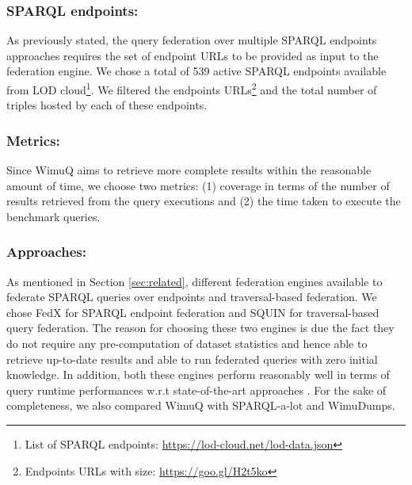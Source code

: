 \subsubsection{SPARQL endpoints:} As previously stated, the query federation over multiple SPARQL endpoints approaches requires the set of endpoint URLs to be provided as input to the federation engine. We chose a total of 539 active SPARQL endpoints available from LOD cloud\footnote{List of SPARQL endpoints: \url{https://lod-cloud.net/lod-data.json}}. We filtered the endpoints URLs\footnote{\label{endpoints}Endpoints URLs with size: \url{https://goo.gl/H2t5ko}} and the total number of triples hosted by each of these endpoints. 

\subsubsection{Metrics:} Since WimuQ aims to retrieve more complete results within the reasonable amount of time, we choose two metrics: (1) coverage in terms of the number of results retrieved from the query executions and (2) the time taken to execute the benchmark queries. 

\subsubsection{Approaches:} As mentioned in Section \ref{sec:related}, different federation engines available to federate SPARQL queries over endpoints and traversal-based federation. We chose FedX \cite{fedx2011} for SPARQL endpoint federation and SQUIN \cite{hartig2013squin} for traversal-based query federation. The reason for choosing these two engines is due the fact they do not require any pre-computation of dataset statistics and hence able to retrieve up-to-date results and able to run federated queries with zero initial knowledge. In addition, both these engines perform reasonably well in terms of query runtime performances w.r.t state-of-the-art approaches \cite{saleem2015fine,saleem2018costfed,hartig2013squin}. For the sake of completeness, we also compared WimuQ with SPARQL-a-lot and WimuDumps.  

